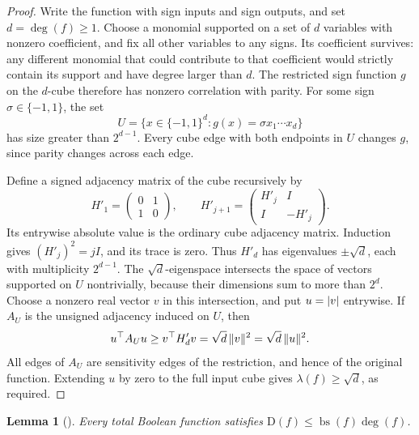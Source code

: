 \documentclass[11pt]{article}
\newtheorem{lemma}[theorem]{Lemma}
\theoremstyle{definition}
\newcommand{\D}{\mathrm D}
\newcommand{\bs}{\operatorname{bs}}
\DeclarePairedDelimiter{\norm}{\lVert}{\rVert}
\DeclarePairedDelimiter{\abs}{\lvert}{\rvert}
\begin{document}
\begin{proof}
Write the function with sign inputs and sign outputs, and set
$d=\deg(f)\ge1$. Choose a monomial supported on a set of $d$ variables
with nonzero coefficient, and fix all other variables to any signs.
Its coefficient survives: any different monomial that could contribute
to that coefficient would strictly contain its support and have degree
larger than $d$. The restricted sign function $g$ on the $d$-cube
therefore has nonzero correlation with parity. For some sign
$\sigma\in\{-1,1\}$, the set
\[
 U=\{x\in\{-1,1\}^d:g(x)=\sigma x_1\cdots x_d\}
\]
has size greater than $2^{d-1}$. Every cube edge with both endpoints in
$U$ changes $g$, since parity changes across each edge.

Define a signed adjacency matrix of the cube recursively by
\[
 H'_1=\begin{pmatrix}0&1\\1&0\end{pmatrix},
 \qquad
 H'_{j+1}=\begin{pmatrix}H'_j&I\\I&-H'_j\end{pmatrix}.
\]
Its entrywise absolute value is the ordinary cube adjacency matrix.
Induction gives $(H'_j)^2=jI$, and its trace is zero. Thus $H'_d$ has
eigenvalues $\pm\sqrt d$, each with multiplicity $2^{d-1}$. The
$\sqrt d$-eigenspace intersects the space of vectors supported on $U$
nontrivially, because their dimensions sum to more than $2^d$.
Choose a nonzero real vector $v$ in this intersection, and put
$u=\abs v$ entrywise. If $A_U$ is the unsigned adjacency induced on
$U$, then
\[
 u^\top A_Uu\ge v^\top H'_dv=\sqrt d\,\norm v^2
             =\sqrt d\,\norm u^2.
\]
All edges of $A_U$ are sensitivity edges of the restriction, and hence
of the original function. Extending $u$ by zero to the full input
cube gives $\lambda(f)\ge\sqrt d$, as required.
\end{proof}

\begin{lemma}[\cite{Midrijanis04}]\label{lem:degree-bs}
Every total Boolean function satisfies
$\D(f)\le\bs(f)\deg(f)$.
\end{lemma}
\end{document}
